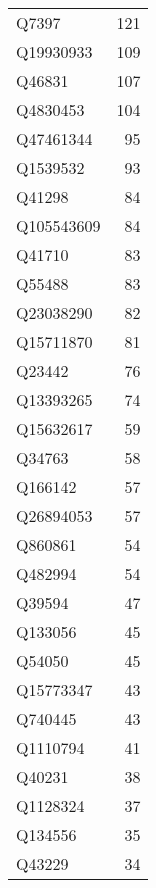 \begin{tabular}{lr}
       Q7397 &                           121 \\
   Q19930933 &                           109 \\
      Q46831 &                           107 \\
    Q4830453 &                           104 \\
   Q47461344 &                            95 \\
    Q1539532 &                            93 \\
      Q41298 &                            84 \\
  Q105543609 &                            84 \\
      Q41710 &                            83 \\
      Q55488 &                            83 \\
   Q23038290 &                            82 \\
   Q15711870 &                            81 \\
      Q23442 &                            76 \\
   Q13393265 &                            74 \\
   Q15632617 &                            59 \\
      Q34763 &                            58 \\
     Q166142 &                            57 \\
   Q26894053 &                            57 \\
     Q860861 &                            54 \\
     Q482994 &                            54 \\
      Q39594 &                            47 \\
     Q133056 &                            45 \\
      Q54050 &                            45 \\
   Q15773347 &                            43 \\
     Q740445 &                            43 \\
    Q1110794 &                            41 \\
      Q40231 &                            38 \\
    Q1128324 &                            37 \\
     Q134556 &                            35 \\
      Q43229 &                            34 \\

\end{tabular}
